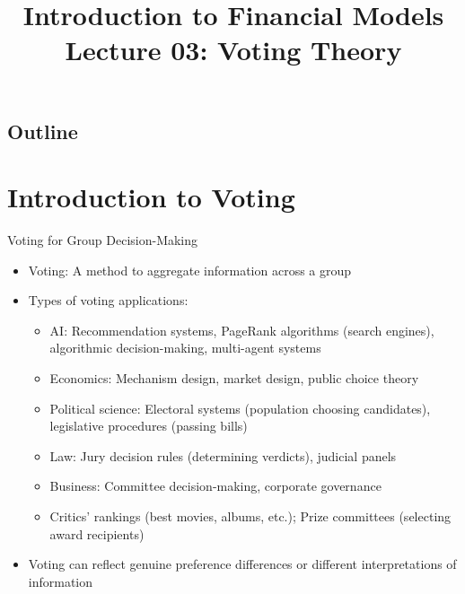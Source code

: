 \documentclass[10pt]{beamer}
\title{Introduction to Financial Models \\ Lecture 03: Voting Theory}
\author{}
\date{}
\begin{document}
\begin{frame}
\titlepage
\end{frame}

\subsection*{Outline}
\begin{frame}
  \tableofcontents
\end{frame}

\section{Introduction to Voting}

\begin{frame}{Voting for Group Decision-Making}
  \begin{itemize}[<+->]
    \item Voting: A method to aggregate information across a group
    \item Types of voting applications:
      \begin{itemize}
        \item AI: Recommendation systems, PageRank algorithms (search engines), algorithmic decision-making, multi-agent systems
        \item Economics: Mechanism design, market design, public choice theory
        \item Political science: Electoral systems (population choosing candidates), legislative procedures (passing bills)
        \item Law: Jury decision rules (determining verdicts), judicial panels
        \item Business: Committee decision-making, corporate governance
        \item Critics' rankings (best movies, albums, etc.); Prize committees (selecting award recipients)
      \end{itemize}
    \item Voting can reflect genuine preference differences or different interpretations of information
  \end{itemize}
\end{frame}
\end{document}
